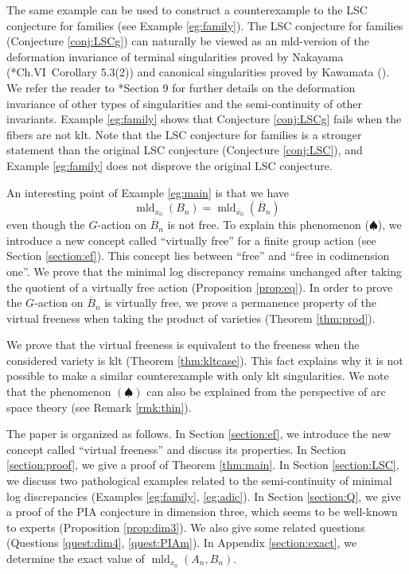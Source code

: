 \documentclass[a4paper,11pt]{amsart}
\theoremstyle{definition}
\theoremstyle{remark}
\begin{document}
The same example can be used to construct a counterexample to the LSC conjecture for families (see Example \ref{eg:family}).
The LSC conjecture for families (Conjecture \ref{conj:LSCg}) can naturally be viewed as an mld-version of the deformation invariance of terminal singularities proved by Nakayama (\cite{Nakbook}*{Ch.VI\ Corollary 5.3(2)}) and canonical singularities proved by Kawamata (\cite{Kaw99}).  
We refer the reader to \cite{IshiiBook}*{Section 9} for further details on the deformation invariance of other types of singularities and the semi-continuity of other invariants.  
Example \ref{eg:family} shows that Conjecture \ref{conj:LSCg} fails when the fibers are not klt. 
Note that the LSC conjecture for families is a stronger statement than the original LSC conjecture (Conjecture \ref{conj:LSC}), 
and Example \ref{eg:family} does not disprove the original LSC conjecture.


An interesting point of Example \ref{eg:main} is that we have
\[
\operatorname{mld}_{x_0}(B_n)  = \operatorname{mld}_{\overline{x}_0}(\overline{B}_n) \tag{$\spadesuit$}
\]
even though the $G$-action on $\overline{B}_n$ is not free. 
To explain this phenomenon ($\spadesuit$), we introduce a new concept called ``virtually free'' for a finite group action (see Section \ref{section:ef}). 
This concept lies between ``free'' and ``free in codimension one''. 
We prove that the minimal log discrepancy remains unchanged after taking the quotient of a virtually free action (Proposition \ref{prop:eq}). 
In order to prove the $G$-action on $\overline{B}_n$ is virtually free, 
we prove a permanence property of the virtual freeness when taking the product of varieties (Theorem \ref{thm:prod}). 

We prove that the virtual freeness is equivalent to the freeness when the considered variety is klt (Theorem \ref{thm:kltcase}). 
This fact explains why it is not possible to make a similar counterexample with only klt singularities. 
We note that the phenomenon $(\spadesuit)$ can also be explained from the perspective of arc space theory (see Remark \ref{rmk:thin}). 


The paper is organized as follows. 
In Section \ref{section:ef}, we introduce the new concept called ``virtual freeness'' and discuss its properties. 
In Section \ref{section:proof}, we give a proof of Theorem \ref{thm:main}. 
In Section \ref{section:LSC}, we discuss two pathological examples related to the semi-continuity of minimal log discrepancies (Examples \ref{eg:family}, \ref{eg:adic}). 
In Section \ref{section:Q}, we give a proof of the PIA conjecture in dimension three, which seems to be well-known to experts (Proposition \ref{prop:dim3}). 
We also give some related questions (Questions \ref{quest:dim4}, \ref{quest:PIAm}). 
In Appendix \ref{section:exact}, we determine the exact value of $\operatorname{mld}_{x_0}(A_n, B_n)$. 
\end{document}
